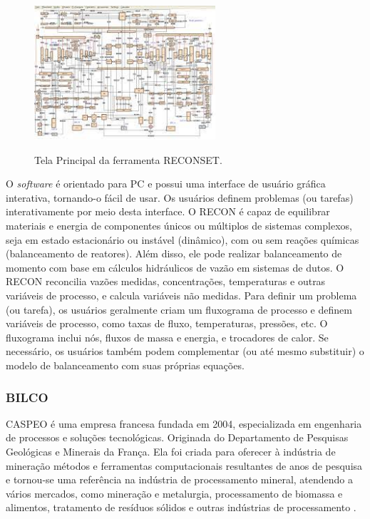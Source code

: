 \begin{figure}[htbp!] 
    \begin{center}
        \includegraphics[width=0.6\textwidth]{figuras/RECONSET.jpg}
        \caption{Tela Principal da ferramenta RECONSET.}
        \vspace{6mm}
        \label{fig:RECONSET}
    \end{center} 
\end{figure}

O \textit{software} é orientado para PC e possui uma interface de usuário gráfica interativa, tornando-o fácil de usar. Os usuários definem problemas (ou tarefas) interativamente por meio desta interface. O RECON é capaz de equilibrar materiais e energia de componentes únicos ou múltiplos de sistemas complexos, seja em estado estacionário ou instável (dinâmico), com ou sem reações químicas (balanceamento de reatores). Além disso, ele pode realizar balanceamento de momento com base em cálculos hidráulicos de vazão em sistemas de dutos. O RECON reconcilia vazões medidas, concentrações, temperaturas e outras variáveis de processo, e calcula variáveis não medidas. Para definir um problema (ou tarefa), os usuários geralmente criam um fluxograma de processo e definem variáveis de processo, como taxas de fluxo, temperaturas, pressões, etc. O fluxograma inclui nós, fluxos de massa e energia, e trocadores de calor. Se necessário, os usuários também podem complementar (ou até mesmo substituir) o modelo de balanceamento com suas próprias equações.

\subsubsection{BILCO}

CASPEO é uma empresa francesa fundada em 2004, especializada em engenharia de processos e soluções tecnológicas. Originada do 
Departamento de Pesquisas Geológicas e Minerais da França. Ela foi criada para oferecer à indústria de mineração métodos e ferramentas computacionais resultantes de anos de pesquisa e tornou-se uma referência na indústria de processamento mineral, atendendo a vários mercados, como mineração e metalurgia, processamento de biomassa e alimentos, tratamento de resíduos sólidos e outras indústrias de processamento \cite{bilco}.

